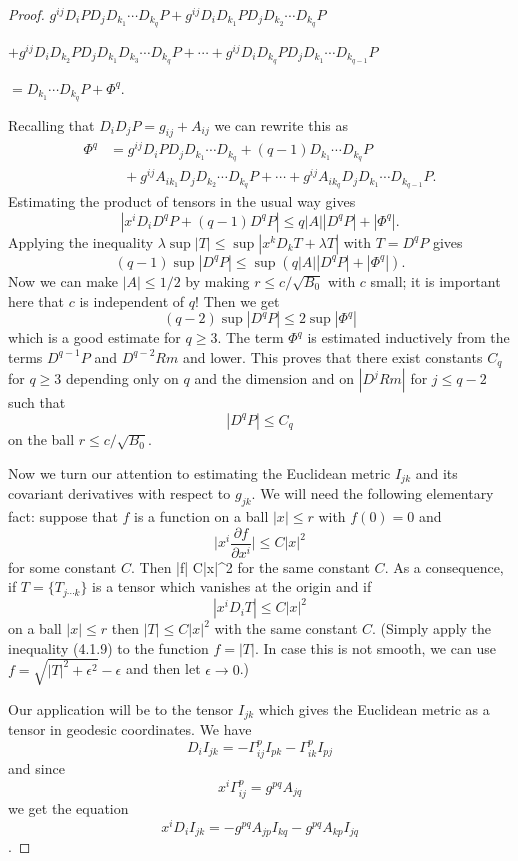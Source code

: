 \begin{proof}
\smallskip\noindent
$g^{ij}D_iPD_jD_{k_1} \cdots D_{k_q}P+g^{ij}D_iD_{k_1}PD_jD_{k_2}
\cdots D_{k_q}P$

\smallskip\noindent
$+g^{ij}D_iD_{k_2}PD_jD_{k_1}D_{k_3} \cdots D_{k_q}P + \cdots +
g^{ij}D_iD_{k_q}PD_jD_{k_1} \cdots D_{k_{q-1}}P$

\smallskip\noindent
$ =D_{k_1} \cdots D_{k_q}P+ \Phi^q$.

\medskip
Recalling that $D_iD_jP=g_{ij}+A_{ij}$ we can rewrite this as
\begin{align*}
\Phi^q &  = g^{ij}D_iPD_jD_{k_1} \cdots D_{k_q}+(q-1)D_{k_1}
\cdots
D_{k_q}P \\
&\quad  + g^{ij}A_{ik_1}D_jD_{k_2} \cdots D_{k_q}P+ \cdots +
g^{ij}A_{ik_q}D_jD_{k_1} \cdots D_{k_{q-1}}P.
\end{align*}
Estimating the product of tensors in the usual way gives
$$
|x^iD_iD^qP+(q-1)D^qP| \leq q|A||D^qP|+|\Phi^q|.
$$
Applying the inequality $\lambda \sup|T| \leq \sup|x^kD_kT+
\lambda T|$ with $T=D^qP$ gives
$$
(q-1) \sup|D^qP| \leq\sup(q|A||D^qP|+| \Phi^q|).
$$
Now we can make $|A| \leq 1/2$ by making $r \leq c/ \sqrt{B_0}$
with $c$ small; it is important here that $c$ is independent of
$q!$ Then we get
$$
(q-2) \operatorname{sup}|D^qP| \leq 2 \operatorname{sup} | \Phi^q|
$$
which is a good estimate for $q \geq 3$. The term $\Phi^q$ is
estimated inductively from the terms $D^{q-1}P$ and $D^{q-2}Rm$
and lower. This proves that there exist constants $C_q$ for $q
\geq 3$ depending only on $q$ and the dimension and on $|D^jRm|$
for $j \leq q-2$ such that
$$
|D^qP| \leq C_q
$$
on the ball $r \leq c/ \sqrt{B_0}.$

Now we turn our attention to estimating the Euclidean metric
$I_{jk}$ and its covariant derivatives with respect to $g_{jk}$.
We will need the following elementary fact: suppose that $f$ is a
function on a ball $|x| \leq r$ with $f(0)=0$ and
$$
\Big| x^i \frac{\partial f}{\partial x^i} \Big| \leq C |x|^2
$$
for some constant $C$. Then \be
|f| \leq C|x|^2  %
\ee for the same constant $C$. As a consequence, if $T = \{T_{j
\cdots k }\}$ is a tensor which vanishes at the origin and if
$$
|x^iD_iT| \leq C|x|^2
$$
on a ball $|x| \leq r$ then $|T| \leq  C|x|^2$ with the same
constant $C$. (Simply apply the inequality (4.1.9) to the function
$f=|T|$. In case this is not smooth, we can use
$f=\sqrt{|T|^2+\epsilon^2}-\epsilon$ and then let $\epsilon\to
0$.)

Our application will be to the tensor $I_{jk}$ which gives the
Euclidean metric as a tensor in geodesic coordinates. We have
$$
D_iI_{jk} = - \Gamma^p_{ij}I_{pk} - \Gamma^p_{ik}I_{pj}
$$
and since
$$
x^i \Gamma^p_{ij} = g^{pq}A_{jq}
$$
we get the equation
$$
x^iD_iI_{jk} = -g^{pq}A_{jp}I_{kq}-g^{pq}A_{kp}I_{jq}
$$.


\end{proof}
